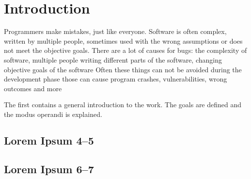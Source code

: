 \chapter{Introduction}
\label{cha:intro}
Programmers make mistakes, just like everyone.
Software is often complex, written by multiple people, sometimes used with the wrong assumptions or does not meet the objective goals. 
There are a lot of causes for bugs: the complexity of software, multiple people writing different parts of the software, changing objective goals of the software 
Often these things can not be avoided during the development phase 
those can cause program crashes, vulnerabilities, wrong outcomes and more 


The first contains a general introduction to the work. The goals are
defined and the modus operandi is explained.

\section{Lorem Ipsum 4--5}
\lipsum[4-5]

\section{Lorem Ipsum 6--7}
\lipsum[6-7]

